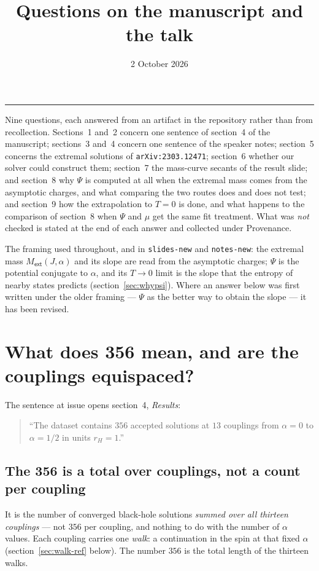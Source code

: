 \documentclass[11pt,a4paper]{article}
\title{Questions on the manuscript and the talk}
\author{}
\date{2 October 2026}
\newcommand{\q}[1]{\subsection*{\color{accent}#1}}
\newcommand{\ext}{\mathsf{ext}}
\begin{document}
\sloppy
\maketitle
\vspace{-0.8cm}

\noindent\rule{\linewidth}{0.4pt}
\medskip

\noindent Nine questions, each answered from an artifact in the repository
rather than from recollection. Sections~1 and~2 concern one sentence of
section~4 of the manuscript; sections~3 and~4 concern one sentence of the
speaker notes; section~5 concerns the extremal solutions of
\texttt{arXiv:2303.12471}; section~6 whether our solver could construct
them; section~7 the mass-curve secants of the result slide; and
section~8 why $\Psi$ is computed at all when the extremal mass comes from the
asymptotic charges, and what comparing the two routes does and does not test;
and section~9 how the extrapolation to $T=0$ is done, and what happens to the
comparison of section~8 when $\Psi$ and $\mu$ get the same fit treatment.
What was \emph{not} checked is stated at the end of each answer
and collected under Provenance.

\noindent The framing used throughout, and in \texttt{slides-new} and
\texttt{notes-new}: the extremal mass $M_\ext(J,\alpha)$ and its slope are read
from the asymptotic charges; $\Psi$ is the potential conjugate to $\alpha$, and
its $T\to0$ limit is the slope that the entropy of nearby states predicts
(section~\ref{sec:whypsi}). Where an answer below was first written under the
older framing --- $\Psi$ as the better way to obtain the slope --- it has been
revised.

\section{What does 356 mean, and are the couplings equispaced?}

\noindent The sentence at issue opens section~4, \emph{Results}:
\begin{quote}
``The dataset contains $356$ accepted solutions at $13$ couplings from
$\alpha=0$ to $\alpha=1/2$ in units $r_H=1$.''
\end{quote}

\q{The 356 is a total over couplings, not a count per coupling}

It is the number of converged black-hole solutions \emph{summed over all
thirteen couplings} --- not $356$ per coupling, and nothing to do with the
number of $\alpha$ values. Each coupling carries one \emph{walk}: a
continuation in the spin at that fixed $\alpha$ (section~\ref{sec:walk-ref}
below). The number $356$ is the total length of the thirteen walks.
\end{document}
